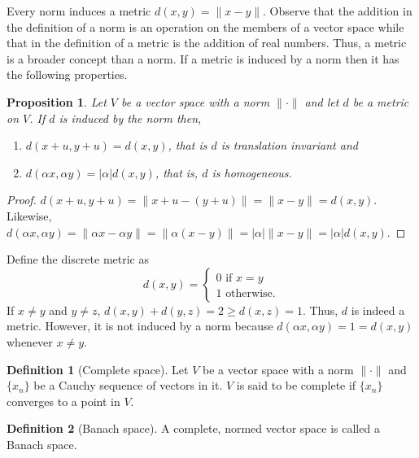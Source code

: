 \documentclass{article}
\theoremstyle{plain}
\numberwithin{thm}{section}
\theoremstyle{plain}
\newtheorem{prop}{Proposition}
\numberwithin{prop}{section}
\theoremstyle{definition}
\newtheorem{defn}{Definition}
\numberwithin{defn}{section}
\theoremstyle{remark}
\numberwithin{equation}{section}
\begin{document}
Every norm induces a metric $d(x, y) = \lVert x - y\rVert$. Observe that
the addition in the definition of a norm is an operation on the members of
a vector space while that in the definition of a metric is the addition of real
numbers. Thus, a metric is a broader concept than a norm. If a metric is
induced by a norm then it has the following properties.
\begin{prop}\label{s2p2}
Let $V$ be a vector space with a norm $\lVert\cdot\rVert$ and let $d$ be a 
metric on $V$. If $d$ is induced by the norm then,
\begin{enumerate}
\item $d(x + u, y + u) = d(x, y)$, that is $d$ is translation invariant and
\item $d(\alpha x, \alpha y) = |\alpha|d(x, y)$, that is, $d$ is homogeneous.
\end{enumerate}
\end{prop}
\begin{proof}
$d(x + u, y + u) = \lVert x + u - (y + u)\rVert=\lVert x - y \rVert = d(x, y)$.
Likewise, $d(\alpha x, \alpha y) = \lVert\alpha x - \alpha y\rVert = \lVert
\alpha(x - y)\rVert = |\alpha|\lVert x - y\rVert = |\alpha|d(x, y)$.
\end{proof}

Define the discrete metric as
\[
d(x, y) = \begin{cases}
0 \text{ if }x = y \\
1 \text{ otherwise.}
\end{cases}
\]
If $x \ne y$ and $y \ne z$, $d(x, y) + d(y, z) = 2 \ge d(x, z) = 1$. Thus, $d$
is indeed a metric. However, it is not induced by a norm because $d(\alpha x,
\alpha y) = 1 = d(x, y)$ whenever $x \ne y$.

\begin{defn}[Complete space]\label{s2d3}
Let $V$ be a vector space with a norm $\lVert\cdot\rVert$ and $\{x_n\}$ be a
Cauchy sequence of vectors in it. $V$ is said to be complete if $\{x_n\}$ 
converges to a point in $V$.
\end{defn}

\begin{defn}[Banach space]\label{s2d4}
A complete, normed vector space is called a Banach space.
\end{defn}
\end{document}
